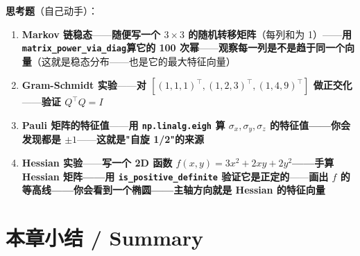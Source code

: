 \textbf{思考题}（自己动手）：

\begin{enumerate}
\item \textbf{Markov 链稳态}——\textbf{随便写一个 $3\times 3$ 的随机转移矩阵}（每列和为 1）——\textbf{用 \texttt{matrix\_power\_via\_diag}\;算它的 100 次幂}——\textbf{观察每一列是不是趋于同一个向量}（这就是稳态分布——也是它的最大特征向量）
\item \textbf{Gram-Schmidt 实验}——\textbf{对 $[(1,1,1)^\top, (1,2,3)^\top, (1,4,9)^\top]$ 做正交化}——\textbf{验证 $Q^\top Q = I$}
\item \textbf{Pauli 矩阵的特征值}——\textbf{用 \texttt{np.linalg.eigh} 算 $\sigma_x, \sigma_y, \sigma_z$ 的特征值——你会发现都是 $\pm 1$}——\textbf{这就是"自旋 1/2"的来源}
\item \textbf{Hessian 实验}——\textbf{写一个 2D 函数 $f(x,y) = 3x^2 + 2xy + 2y^2$——手算 Hessian 矩阵——用 \texttt{is\_positive\_definite} 验证它是正定的}——\textbf{画出 $f$ 的等高线——你会看到一个椭圆——主轴方向就是 Hessian 的特征向量}
\end{enumerate}

\section{本章小结 / Summary}

